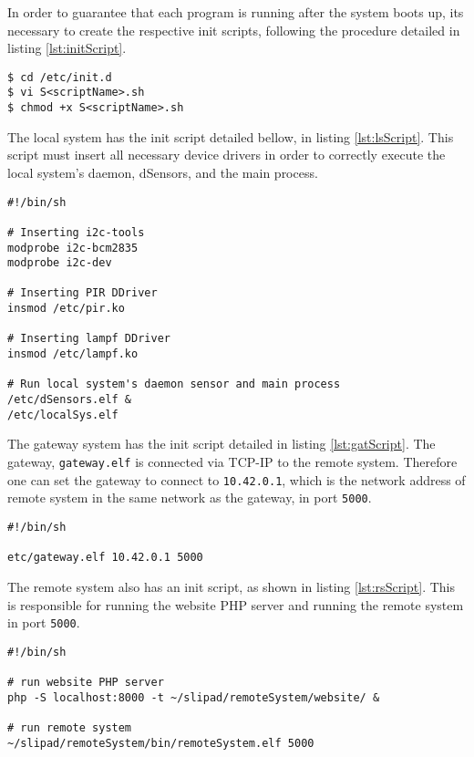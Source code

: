 In order to guarantee that each program is running after the system boots up, its necessary to create the respective init scripts, following the procedure detailed in listing \ref{lst:initScript}.

\begin{lstlisting}[caption={Procedure for creating an init script, named Sscript\_name}, label={lst:initScript}]
$ cd /etc/init.d
$ vi S<scriptName>.sh
$ chmod +x S<scriptName>.sh
\end{lstlisting}

The local system has the init script detailed bellow, in listing \ref{lst:lsScript}. This script must insert all necessary device drivers in order to correctly execute the local system's daemon, dSensors, and the main process. 

\begin{lstlisting}[caption={Init script for local system.}, label={lst:lsScript}]
#!/bin/sh

# Inserting i2c-tools
modprobe i2c-bcm2835
modprobe i2c-dev

# Inserting PIR DDriver
insmod /etc/pir.ko

# Inserting lampf DDriver
insmod /etc/lampf.ko

# Run local system's daemon sensor and main process
/etc/dSensors.elf &
/etc/localSys.elf
\end{lstlisting}

The gateway system has the init script detailed in listing \ref{lst:gatScript}. The gateway, \verb|gateway.elf| is connected via TCP-IP to the remote system. Therefore one can set the gateway to connect to \verb|10.42.0.1|, which is the network address of remote system in the same network as the gateway, in port \verb|5000|.

\begin{lstlisting}[caption={Init script for Gateway system.}, label={lst:gatScript}]
#!/bin/sh

etc/gateway.elf 10.42.0.1 5000
\end{lstlisting}

The remote system also has an init script, as shown in listing \ref{lst:rsScript}. This is responsible for running the website PHP server \cite{phpserver} and running the remote system in port \verb|5000|.

\begin{lstlisting}[caption={Init script for remote system.}, label={lst:rsScript}]
#!/bin/sh

# run website PHP server
php -S localhost:8000 -t ~/slipad/remoteSystem/website/ &

# run remote system
~/slipad/remoteSystem/bin/remoteSystem.elf 5000

\end{lstlisting}